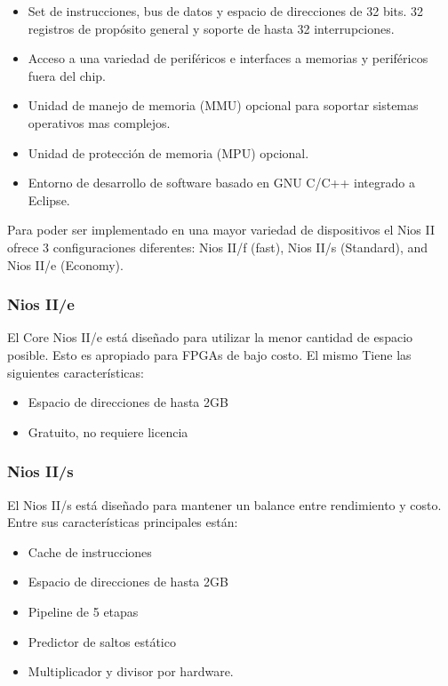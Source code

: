 \begin{itemize}
	\item Set de instrucciones, bus de datos y espacio de direcciones de 32 bits. 32 registros de propósito general y soporte de hasta 32 interrupciones.
	\item Acceso a una variedad de periféricos e interfaces a memorias y periféricos fuera del chip.
	\item Unidad de manejo de memoria (MMU) opcional para soportar sistemas operativos mas complejos.
	\item Unidad de protección de memoria (MPU) opcional.
	\item Entorno de desarrollo de software basado en GNU C/C++ integrado a Eclipse.
\end{itemize}

Para poder ser implementado en una mayor variedad de dispositivos el Nios II ofrece 3 configuraciones diferentes:  Nios II/f (fast), Nios II/s (Standard), and Nios II/e (Economy).

\subsubsection{Nios II/e}
El Core Nios II/e está diseñado para utilizar la menor cantidad de espacio posible. Esto es apropiado para FPGAs de bajo costo. El mismo Tiene las siguientes características:
\begin{itemize}
	\item Espacio de direcciones de hasta 2GB
	\item Gratuito, no requiere licencia 
\end{itemize}

\subsubsection{Nios II/s}
El Nios II/s está diseñado para mantener un balance entre rendimiento y costo. Entre sus características principales están:

\begin{itemize}
	\item Cache de instrucciones
	\item Espacio de direcciones de hasta 2GB
	\item Pipeline de 5 etapas
	\item Predictor de saltos estático
	\item Multiplicador y divisor por hardware. 
\end{itemize}

